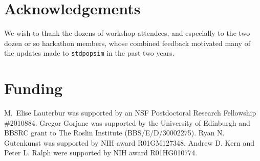 \documentclass[hidelinks]{article}
\newcommand{\stdpopsim}{\texttt{stdpopsim}\xspace}
\begin{document}
\section*{Acknowledgements}\label{acknowledgements}

We wish to thank the dozens of workshop attendees,
and especially to the two dozen or so hackathon members,
whose combined feedback motivated many of the updates made to \stdpopsim in the past two years.

\section*{Funding}
    \label{funding}

M.~Elise Lauterbur was supported by an NSF Postdoctoral Research Fellowship \#2010884.
Gregor Gorjanc was supported by the University of Edinburgh and BBSRC grant to The Roslin Institute (BBS/E/D/30002275).
Ryan N. Gutenkunst was supported by NIH award R01GM127348.
Andrew D. Kern and Peter L. Ralph were supported by NIH award R01HG010774.


\end{document}
